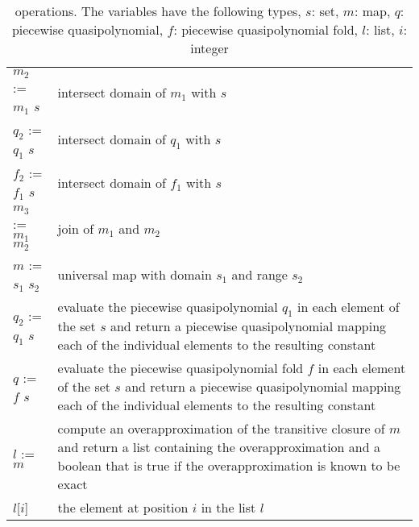 \begin{table}
\begin{tabular}{lp{}}
\\
$m_2$ := $m_1$ \ai{$*$} $s$ & intersect domain of $m_1$ with $s$
\\
$q_2$ := $q_1$ \ai{$*$} $s$ & intersect domain of $q_1$ with $s$
\\
$f_2$ := $f_1$ \ai{$*$} $s$ & intersect domain of $f_1$ with $s$
\\
$m_3$ := $m_1$ \ai[\tt]{.} $m_2$ & join of $m_1$ and $m_2$
\\
$m$ := $s_1$ \ai[\tt]{->} $s_2$ & universal map with domain $s_1$
and range $s_2$
\\
$q_2$ := $q_1$ \ai{@} $s$ &
evaluate the piecewise quasipolynomial $q_1$ in each element
of the set $s$ and return a piecewise quasipolynomial
mapping each of the individual elements to the resulting
constant
\\
$q$ := $f$ \ai{@} $s$ &
evaluate the piecewise quasipolynomial fold $f$ in each element
of the set $s$ and return a piecewise quasipolynomial
mapping each of the individual elements to the resulting
constant
\\
$l$ := $m$\ai[\tt]{\^{}+} &
compute an overapproximation of the transitive closure
of $m$ and return a list containing the overapproximation
and a boolean that is true if the overapproximation
is known to be exact
\\
$l$[$i$] &
the element at position $i$ in the list $l$
\\
\end{tabular}
\caption{\protect{} operations.  The variables
have the following types,
$s$: set,
$m$: map,
$q$: piecewise quasipolynomial,
$f$: piecewise quasipolynomial fold,
$l$: list,
$i$: integer
}
\label{t:iscc}
\end{table}

